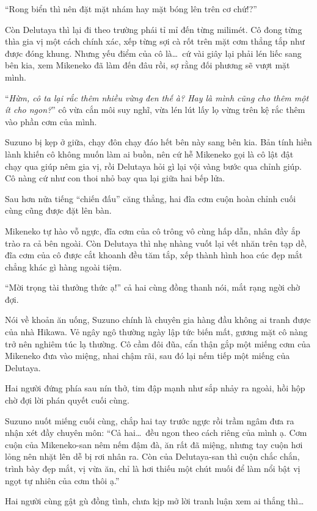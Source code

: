 ﻿\documentclass[../main.tex]{subfiles}
\begin{document}
``Rong biển thì nên đặt mặt nhám hay mặt bóng lên trên cơ chứ!?''

Còn Delutaya thì lại đi theo trường phái tỉ mỉ đến từng milimét. Cô đong từng thìa gia vị một cách chính xác, xếp từng sợi cà rốt trên mặt cơm thẳng tắp như được đóng khung. Nhưng yếu điểm của cô là\dots\ cứ vài giây lại phải lén liếc sang bên kia, xem Mikeneko đã làm đến đâu rồi, sợ rằng đối phương sẽ vượt mặt mình.

``\textit{Hừm, cô ta lại rắc thêm nhiều vừng đen thế à? Hay là mình cũng cho thêm một ít cho ngon?}'' cô vừa cắn môi suy nghĩ, vừa lén lút lấy lọ vừng trên kệ rắc thêm vào phần cơm của mình.

Suzuno bị kẹp ở giữa, chạy đôn chạy đáo hết bên này sang bên kia. Bản tính hiền lành khiến cô không muốn làm ai buồn, nên cứ hễ Mikeneko gọi là cô lật đật chạy qua giúp nêm gia vị, rồi Delutaya hỏi gì lại vội vàng bước qua chỉnh giúp. Cô nàng cứ như con thoi nhỏ bay qua lại giữa hai bếp lửa.

Sau hơn nửa tiếng ``chiến đấu'' căng thẳng, hai đĩa cơm cuộn hoàn chỉnh cuối cùng cũng được đặt lên bàn.

Mikeneko tự hào vỗ ngực, đĩa cơm của cô trông vô cùng hấp dẫn, nhân đầy ắp trào ra cả bên ngoài. Còn Delutaya thì nhẹ nhàng vuốt lại vết nhăn trên tạp dề, đĩa cơm của cô được cắt khoanh đều tăm tắp, xếp thành hình hoa cúc đẹp mắt chẳng khác gì hàng ngoài tiệm.

``Mời trọng tài thưởng thức ạ!'' cả hai cùng đồng thanh nói, mắt rạng ngời chờ đợi.

Nói về khoản ăn uống, Suzuno chính là chuyên gia hàng đầu không ai tranh được của nhà Hikawa. Vẻ ngây ngô thường ngày lập tức biến mất, gương mặt cô nàng trở nên nghiêm túc lạ thường. Cô cầm đôi đũa, cẩn thận gắp một miếng cơm của Mikeneko đưa vào miệng, nhai chậm rãi, sau đó lại nếm tiếp một miếng của Delutaya.

Hai người đứng phía sau nín thở, tim đập mạnh như sắp nhảy ra ngoài, hồi hộp chờ đợi lời phán quyết cuối cùng.

Suzuno nuốt miếng cuối cùng, chắp hai tay trước ngực rồi trầm ngâm đưa ra nhận xét đầy chuyên môn: ``Cả hai\dots\ đều ngon theo cách riêng của mình ạ. Cơm cuộn của Mikeneko-san nêm nếm đậm đà, ăn rất đã miệng, nhưng tay cuộn hơi lỏng nên nhặt lên dễ bị rơi nhân ra. Còn của Delutaya-san thì cuộn chắc chắn, trình bày đẹp mắt, vị vừa ăn, chỉ là hơi thiếu một chút muối để làm nổi bật vị ngọt tự nhiên của cơm thôi ạ.''

Hai người cùng gật gù đồng tình, chưa kịp mở lời tranh luận xem ai thắng thì\dots
\end{document}

